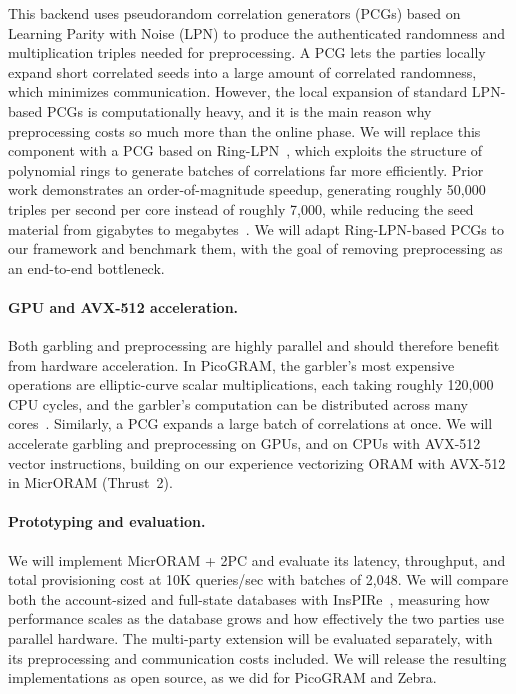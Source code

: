 This backend uses pseudorandom correlation generators (PCGs)
based on Learning Parity with Noise (LPN) to produce the authenticated
randomness and multiplication triples needed for preprocessing. A PCG lets
the parties locally expand short correlated seeds into a large amount of
correlated randomness, which minimizes communication. However, the local
expansion of standard LPN-based PCGs is computationally heavy, and it is
the main reason why preprocessing costs so much more than the online
phase. We will replace this component with a PCG based on
Ring-LPN~\cite{ringlpnpcg}, which exploits the structure of polynomial
rings to generate batches of correlations far more efficiently. Prior work
demonstrates an order-of-magnitude speedup, generating roughly 50,000
triples per second per core instead of roughly 7,000, while reducing the
seed material from gigabytes to megabytes~\cite{ringlpnpcg}. We will adapt
Ring-LPN-based PCGs to our framework and benchmark them, with the goal of
removing preprocessing as an end-to-end bottleneck.

\paragraph{GPU and AVX-512 acceleration.}
Both garbling and preprocessing are highly parallel and should therefore
benefit from hardware acceleration. In PicoGRAM, the garbler's most
expensive operations are elliptic-curve scalar multiplications, each
taking roughly 120,000 CPU cycles, and the garbler's computation can be
distributed across many cores~\cite{picogram}. Similarly, a PCG expands a
large batch of correlations at once. We will accelerate garbling and
preprocessing on GPUs, and on CPUs with AVX-512 vector instructions,
building on our experience vectorizing ORAM with AVX-512 in MicrORAM
(Thrust~2).

\paragraph{Prototyping and evaluation.}
We will implement MicrORAM + 2PC and evaluate its latency, throughput,
and total provisioning cost at 10K queries/sec with batches of 2,048.
We will compare both the account-sized and full-state databases with
InsPIRe~\cite{efinspire}, measuring how performance scales as the database
grows and how effectively the two parties use parallel hardware.
The multi-party extension will be evaluated separately, with its
preprocessing and communication costs included. We will release the
resulting implementations as open source, as we did for PicoGRAM and Zebra.

